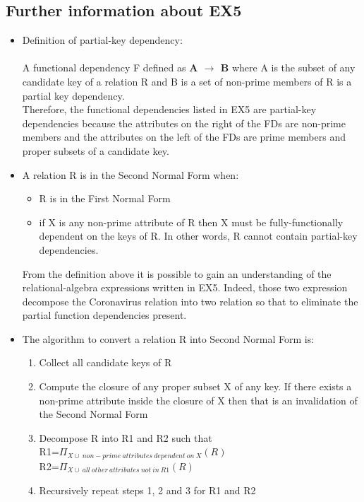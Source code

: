 \documentclass{article}
\begin{document}
\subsection{Further information about EX5} \label{EX5}
\begin{itemize}
    \item 
Definition of partial-key dependency:\\\\
A functional dependency F defined as \textbf{A $\rightarrow$ B} where A is the subset of any candidate key of a relation R and B is a set of non-prime members of R is a partial key dependency.\\
Therefore, the functional dependencies listed in EX5 are partial-key dependencies because the attributes on the right of the FDs are non-prime members and the attributes on the left of the FDs are prime members and proper subsets of a candidate key.
\item A relation R is in the Second Normal Form when:
\begin{itemize}
    \item R is in the First Normal Form
    \item if X is any non-prime attribute of R then X must be fully-functionally dependent on the keys of R. In other words, R cannot contain partial-key dependencies.
\end{itemize}
From the definition above it is possible to gain an understanding of the relational-algebra expressions written in EX5. Indeed, those two expression decompose the Coronavirus relation into two relation so that to eliminate the partial function dependencies present.\\
\item
The algorithm to convert a relation R into Second Normal Form is:
\begin{enumerate}
    \item Collect all candidate keys of R
    \item  Compute the closure of any proper subset X of any key. If there exists a non-prime attribute inside the closure of X then that is an invalidation of the Second Normal Form
    \item Decompose R into R1 and R2 such that\\
    R1=$\Pi_{X \cup \: non-prime \: attributes\: dependent\: on\: X}(R)$\\
    R2=$\Pi_{X \cup \: all \: other \: attributes \: not \: in \: R1}(R)$
    
    \item Recursively repeat steps 1, 2 and 3 for R1 and R2
    
\end{enumerate}
\end{itemize}
\end{document}
